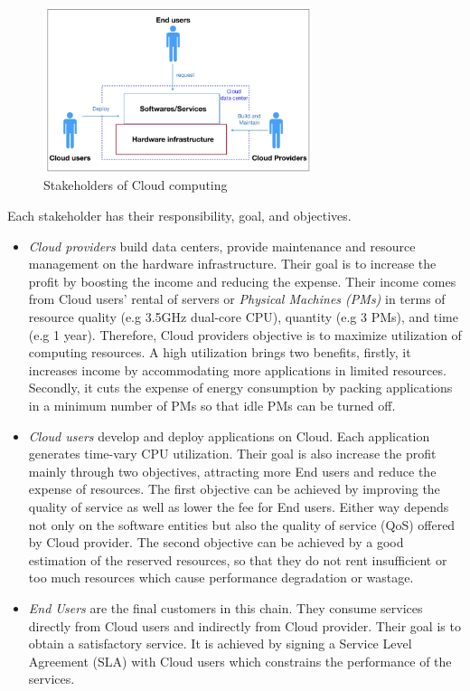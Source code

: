 \begin{figure}
	\centering
	\includegraphics[width=0.7\textwidth]{pics/stakeholders.png}
	\caption{Stakeholders of Cloud computing}
	\label{fig:stakeholders}
\end{figure}
Each stakeholder has their responsibility, goal, and objectives. 
\begin{itemize}
	\item \emph{Cloud providers} build data centers, provide maintenance and resource management on the hardware infrastructure. Their goal is to increase the profit by boosting the income and reducing the expense. Their income comes from Cloud users' rental of servers or \emph{Physical Machines (PMs)} in terms of resource quality (e.g  3.5GHz dual-core CPU), quantity (e.g 3 PMs), and time (e.g 1 year). Therefore, Cloud providers objective is to maximize utilization of computing resources. A high utilization brings two benefits, firstly, it increases income by accommodating more applications in limited resources. Secondly, it cuts the expense of energy consumption by packing applications in a minimum number of PMs so that idle PMs can be turned off. 	
	\item \emph{Cloud users} develop and deploy applications on Cloud. Each application generates time-vary CPU utilization. Their goal is also increase the profit mainly through two objectives, attracting more End users and reduce the expense of resources. The first objective can be achieved by improving the quality of service as well as lower the fee for End users. Either way depends not only on the software entities but also the quality of service (QoS) offered by Cloud provider. The second objective can be achieved by a good estimation of the reserved resources, so that they do not rent insufficient  or too much resources which cause performance degradation or wastage.
	\item \emph{End Users} are the final customers in this chain. They consume services directly from Cloud users and indirectly from Cloud provider. Their goal is to obtain a satisfactory service. It is achieved by signing a Service Level Agreement (SLA) with Cloud users which constrains the performance of the services.
\end{itemize}

